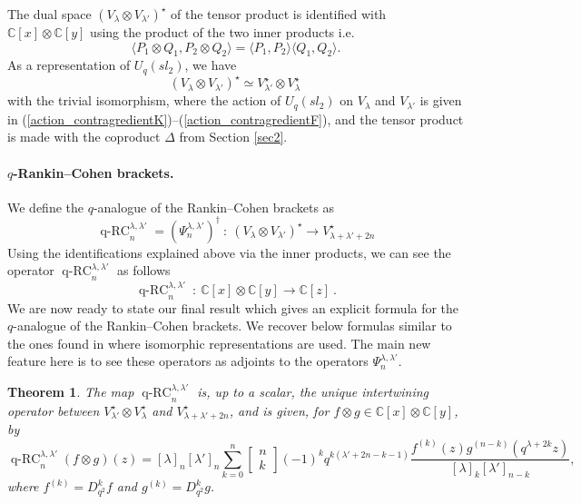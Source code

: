 \documentclass[a4paper,12pt]{article}
\numberwithin{equation}{section}
\newcommand{\C}{\mathbb{C}}
\newcommand{\qbinom}[2]{\begin{bmatrix}#1\\#2\end{bmatrix}}
\newtheorem{theo}{Theorem}[section]
\theoremstyle{rem}
\theoremstyle{definition}
\begin{document}
The dual space $(V_\lambda\otimes V_{\lambda'})^\star$ of the tensor product is identified with $\C[x]\otimes \C[y]$ using the product of the two inner products i.e.
\[
\langle P_1\otimes Q_1,P_2\otimes Q_2 \rangle=\langle P_1,P_2 \rangle\langle Q_1,Q_2\rangle. 
\]
As a representation of $U_q(sl_2)$, we have
\begin{equation}\label{iso_dual}(V_\lambda\otimes V_{\lambda'})^\star\simeq V_{\lambda'}^\star\otimes V_\lambda^\star\,
\end{equation}
with the trivial isomorphism, where the action of $U_q(sl_2)$ on $V_\lambda$ and $V_{\lambda'}$ is given in (\ref{action_contragredientK})--(\ref{action_contragredientF}), and the tensor product is made with the coproduct $\Delta$ from Section \ref{sec2}.


\paragraph{$q$-Rankin--Cohen brackets.} We define the $q$-analogue of the Rankin--Cohen brackets as
\begin{equation}
    \operatorname{q-RC}^{\lambda,\lambda'}_n=\left(\Psi_n^{\lambda,\lambda'}\right)^\dagger\ :\ (V_\lambda\otimes V_{\lambda'})^\star\to V_{\lambda+\lambda'+2n}^{\star}
\end{equation}
Using the identifications explained above via the inner products, we can see the operator $\operatorname{q-RC}^{\lambda,\lambda'}_n$ as follows
\[\operatorname{q-RC}^{\lambda,\lambda'}_n\ :\ \mathbb{C}[x]\otimes\mathbb{C}[y]\to\mathbb{C}[z]\ .\]
We are now ready to state our final result which gives an explicit formula for the $q$-analogue of the Rankin--Cohen brackets. We recover below formulas similar to the ones found in \cite{Ros} where isomorphic representations are used. The main new feature here is to see these operators as adjoints to the operators $\Psi_n^{\lambda,\lambda'}$.
\begin{theo}\label{thm:qRankinCohenV1}
The map $\operatorname{q-RC}^{\lambda,\lambda'}_n$ is, up to a scalar, the unique intertwining operator between $V_{\lambda'}^\star\otimes V_{\lambda}^\star$ and $V_{\lambda+\lambda'+2n}^\star$, and is given,
for $f\otimes g\in \C[x]\otimes \C[y]$, by
\begin{equation}\label{eq:qRankinCohenV1}
 \operatorname{q-RC}^{\lambda,\lambda'}_n (f\otimes g)(z)=
[\lambda]_n[\lambda']_n\sum_{k=0}^n \qbinom{n}{k}(-1)^k q^{k(\lambda'+2n-k-1)} \frac{f^{(k)}(z)g^{(n-k)}(q^{\lambda+2k}z)}{[\lambda]_k[\lambda']_{n-k}},
\end{equation}
where $f^{(k)}=D_{q^2}^kf$ and $g^{(k)}=D_{q^2}^kg$.
\end{theo}
\end{document}
